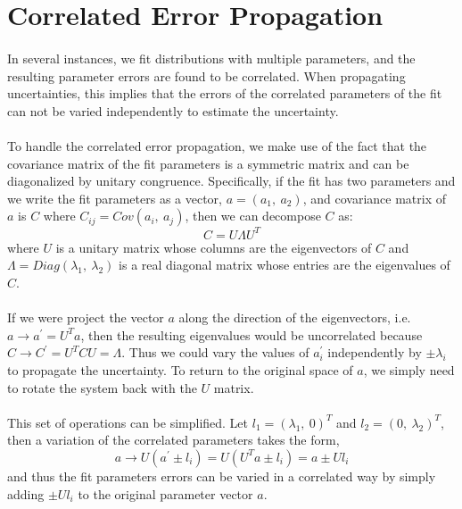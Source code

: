 \section{Correlated Error Propagation}
\label{app:correrr}
\paragraph{}
In several instances, we fit distributions with multiple parameters, and the resulting parameter errors are found to be correlated.  When propagating uncertainties, this implies that the errors of the correlated parameters of the fit can not be varied independently to estimate the uncertainty.  

\paragraph{}
To handle the correlated error propagation, we make use of the fact that the covariance matrix of the fit parameters is a symmetric matrix and can be diagonalized by unitary congruence.  Specifically, if the fit has two parameters and we write the fit parameters as a vector, $a = (a_1,\ a_2)$, and covariance matrix of $a$ is $C$ where $C_{ij} = Cov(a_i,\ a_j)$, then we can decompose $C$ as:
\begin{equation}
C = U \Lambda U^{T}
\end{equation}
where $U$ is a unitary matrix whose columns are the eigenvectors of $C$ and $\Lambda = Diag(\lambda_{1},\ \lambda_{2})$ is a real diagonal matrix whose entries are the eigenvalues of $C$.

\paragraph{}
If we were project the vector $a$ along the direction of the eigenvectors, i.e. $a \to a^{\prime} = U^{T}a$, then the resulting eigenvalues would be uncorrelated because $C \to C^{\prime} = U^{T} C U = \Lambda$.   Thus we could vary the values of $a^{\prime}_{i}$ independently by $\pm \lambda_i$ to propagate the uncertainty.  To return to the original space of $a$, we simply need to rotate the system back with the $U$ matrix.  

\paragraph{}
This set of operations can be simplified.  Let $l_1 = (\lambda_1,\ 0)^T$ and $l_2 = (0,\ \lambda_2)^T$, then a variation of the correlated parameters takes the form,
\begin{equation}
a \to U( a^{\prime} \pm l_i) = U( U^{T} a \pm l_i) = a \pm U l_{i}
\end{equation}
and thus the fit parameters errors can be varied in a correlated way by simply adding $\pm U l_{i}$ to the original parameter vector $a$.
